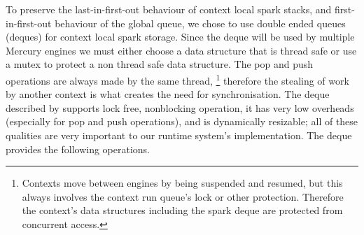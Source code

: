 To preserve the last-in-first-out behaviour of context local spark
stacks,
and first-in-first-out behaviour of the global queue,
we chose to use double ended queues (deques) for context local spark
storage.
Since the deque will be used by multiple Mercury engines we must either
choose a data structure that is thread safe or use a mutex to protect a non
thread safe data structure.
The pop and push operations are always made by the same thread,%
\footnote{
    Contexts move between engines by being suspended and resumed,
    but this always involves the context run queue's lock or other
    protection.
    Therefore the context's data structures including the
    spark deque are protected from concurrent access.}
therefore the stealing of work by another context is what creates the need
for synchronisation.
The deque described by \citet{Chase_2005_wsdeque} supports lock free,
nonblocking
operation, it has very low overheads (especially for pop and push operations),
and is dynamically resizable;
all of these qualities are very important to our runtime system's
implementation.
The deque provides the following operations.

